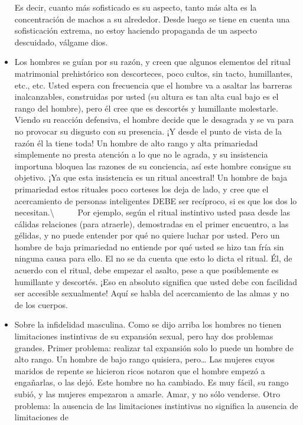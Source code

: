 \begin{itemize}
  Es decir, cuanto más sofisticado es su aspecto, tanto más alta es la
  concentración de machos a su alrededor. Desde luego se tiene en cuenta
  una sofisticación extrema, no estoy haciendo propaganda de un aspecto
  descuidado, válgame dios.
\item
  Los hombres se guían por su razón, y creen que algunos elementos del
  ritual matrimonial prehistórico son descorteces, poco cultos, sin
  tacto, humillantes, etc., etc. Usted espera con frecuencia que el
  hombre va a asaltar las barreras inalcanzables, construidas por usted
  (su altura es tan alta cual bajo es el rango del hombre), pero él cree
  que es descortés y humillante molestarle. Viendo su reacción
  defensiva, el hombre decide que le desagrada y se va para no provocar
  su disgusto con su presencia. ¡Y desde el punto de vista de la razón
  él la tiene toda! Un hombre de alto rango y alta primariedad
  simplemente no presta atención a lo que no le agrada, y su insistencia
  importuna bloquea las razones de su conciencia, así este hombre
  consigue su objetivo. ¡Ya que esta insistencia es un ritual ancestral!
  Un hombre de baja primariedad estos rituales poco corteses los deja de
  lado, y cree que el acercamiento de personas inteligentes DEBE ser
  recíproco, si es que los dos lo necesitan.\textbackslash{} ~ ~ ~ Por
  ejemplo, según el ritual instintivo usted pasa desde las cálidas
  relaciones (para atraerle), demostradas en el primer encuentro, a las
  gélidas, y no puede entender por qué no quiere luchar por usted. Pero
  un hombre de baja primariedad no entiende por qué usted se hizo tan
  fría sin ninguna causa para ello. El no se da cuenta que esto lo dicta
  el ritual. Él, de acuerdo con el ritual, debe empezar el asalto, pese
  a que posiblemente es humillante y descortés. ¡Eso en absoluto
  significa que usted debe con facilidad ser accesible sexualmente! Aquí
  se habla del acercamiento de las almas y no de los cuerpos.
\item
  Sobre la infidelidad masculina. Como se dijo arriba los hombres no
  tienen limitaciones instintivas de su expansión sexual, pero hay dos
  problemas grandes. Primer problema: realizar tal expansión solo lo
  puede un hombre de alto rango. Un hombre de bajo rango quisiera,
  pero\ldots{} Las mujeres cuyos maridos de repente se hicieron ricos
  notaron que el hombre empezó a engañarlas, o las dejó. Este hombre no
  ha cambiado. Es muy fácil, su rango subió, y las mujeres empezaron a
  amarle. Amar, y no sólo venderse. Otro problema: la ausencia de las
  limitaciones instintivas no significa la ausencia de limitaciones de

\end{itemize}
